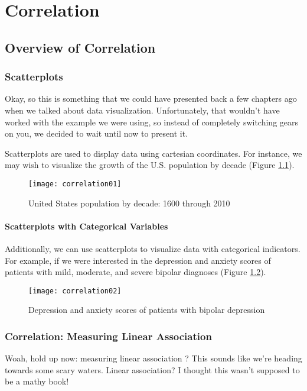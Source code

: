 
\chapter{Correlation}

\section{Overview of Correlation}

\subsection{Scatterplots}
Okay, so this is something that we could have presented back a few chapters ago when we talked about data visualization. Unfortunately, that wouldn't have worked with the example we were using, so instead of completely switching gears on you, we decided to wait until now to present it.

Scatterplots  are used to display data using cartesian coordinates. For instance, we may wish to visualize the growth of the U.S. population by decade (Figure \ref{fig:correlation01}).

\begin{figure}[htp]
	\texttt{[image: correlation01]}
	\caption{United States population by decade: 1600 through 2010}
	\label{fig:correlation01}
\end{figure}

\subsubsection{Scatterplots with Categorical Variables}
Additionally, we can use scatterplots to visualize data with categorical indicators. For example, if we were interested in the depression and anxiety scores of patients with mild, moderate, and severe bipolar diagnoses (Figure \ref{fig:correlation02}).

\begin{figure}[htp]
	\texttt{[image: correlation02]}
	\caption{Depression and anxiety scores of patients with bipolar depression}
	\label{fig:correlation02}
\end{figure}

\subsection{Correlation: Measuring Linear Association}
Woah, hold up now: measuring linear association ? This sounds like we're heading towards some scary waters. Linear association? I thought this wasn't supposed to be a mathy book!

